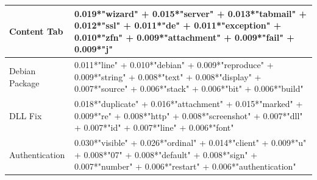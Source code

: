\documentclass[a4paper,12pt,twoside]{report}
\begin{document}
\begin{table}
\begin{adjustbox}{max width=\columnwidth}
\begin{tabular}{p{3cm} p{12cm}}
			\midrule 
			Content Tab & 0.019*"wizard" + 0.015*"server" + 0.013*"tabmail" + 0.012*"ssl" + 0.011*"de" + 0.011*"exception" + 0.010*"zfn" + 0.009*"attachment" + 0.009*"fail" + 0.009*"j" \\
			\midrule 
			Debian Package & 0.011*"line" + 0.010*"debian" + 0.009*"reproduce" + 0.009*"string" + 0.008*"text" + 0.008*"display" + 0.007*"source" + 0.006*"stack" + 0.006*"bit" + 0.006*"build" \\
			\midrule 
			DLL Fix & 0.018*"duplicate" + 0.016*"attachment" + 0.015*"marked" + 0.009*"re" + 0.008*"http" + 0.008*"screenshot" + 0.007*"dll" + 0.007*"id" + 0.007*"line" + 0.006*"font" \\
			\midrule 
			Authentication & 0.030*"visible" + 0.026*"ordinal" + 0.014*"client" + 0.009*"u" + 0.008*"07" + 0.008*"default" + 0.008*"sign" + 0.007*"number" + 0.006*"restart" + 0.006*"authentication" \\
        \midrule
    \end{tabular}
    \end{adjustbox}
    \label{tab:tmThunderbird}
\end{table} 
\end{document}
